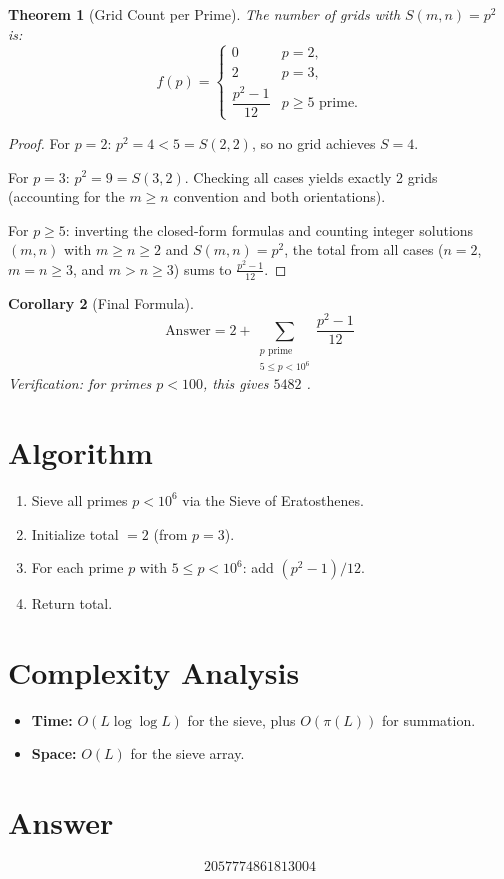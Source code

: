 \documentclass[12pt]{article}
\newtheorem{theorem}{Theorem}
\newtheorem{corollary}[theorem]{Corollary}
\begin{document}
\begin{theorem}[Grid Count per Prime]
The number of grids with $S(m,n) = p^2$ is:
\[
    f(p) = \begin{cases}
        0 & p = 2, \\
        2 & p = 3, \\
        \dfrac{p^2 - 1}{12} & p \ge 5 \text{ prime}.
    \end{cases}
\]
\end{theorem}

\begin{proof}
For $p = 2$: $p^2 = 4 < 5 = S(2,2)$, so no grid achieves $S = 4$.

For $p = 3$: $p^2 = 9 = S(3,2)$. Checking all cases yields exactly 2 grids (accounting for the $m \ge n$ convention and both orientations).

For $p \ge 5$: inverting the closed-form formulas and counting integer solutions $(m,n)$ with $m \ge n \ge 2$ and $S(m,n) = p^2$, the total from all cases ($n=2$, $m=n\ge 3$, and $m > n \ge 3$) sums to $\frac{p^2 - 1}{12}$.
\end{proof}

\begin{corollary}[Final Formula]
\[
    \text{Answer} = 2 + \sum_{\substack{p \text{ prime} \\ 5 \le p < 10^6}} \frac{p^2 - 1}{12}
\]
Verification: for primes $p < 100$, this gives $5482$ \checkmark.
\end{corollary}

\section{Algorithm}

\begin{enumerate}
    \item Sieve all primes $p < 10^6$ via the Sieve of Eratosthenes.
    \item Initialize total $= 2$ (from $p = 3$).
    \item For each prime $p$ with $5 \le p < 10^6$: add $(p^2 - 1)/12$.
    \item Return total.
\end{enumerate}

\section{Complexity Analysis}

\begin{itemize}
    \item \textbf{Time:} $O(L \log \log L)$ for the sieve, plus $O(\pi(L))$ for summation.
    \item \textbf{Space:} $O(L)$ for the sieve array.
\end{itemize}

\section{Answer}

\[
\boxed{2057774861813004}
\]
\end{document}

